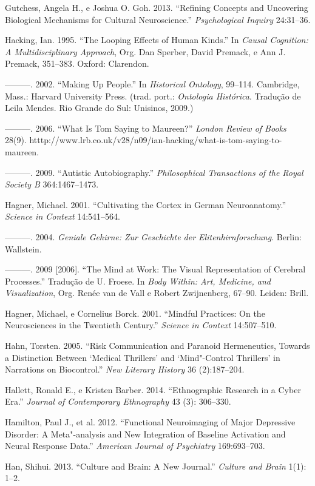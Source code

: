 Gutchess, Angela H., e Joshua O. Goh. 2013. ``Refining Concepts and
Uncovering Biological Mechanisms for Cultural Neuroscience.''
\emph{Psychological Inquiry} 24:31--36.

Hacking, Ian. 1995. ``The Looping Effects of Human Kinds.'' In
\emph{Causal Cognition: A Multidisciplinary Approach}, Org. Dan Sperber,
David Premack, e Ann J. Premack, 351--383. Oxford: Clarendon.

---------. 2002. ``Making Up People.'' In \emph{Historical Ontology},
99--114. Cambridge, Mass.: Harvard University Press. (trad. port.:
\emph{Ontologia Histórica}. Tradução de Leila Mendes. Rio Grande do Sul:
Unisinos, 2009.)

---------. 2006. ``What Is Tom Saying to Maureen?'' \emph{London Review
of Books} 28(9).
htttp://www.lrb.co.uk/v28/n09/ian-hacking/what-is-tom-saying-to-maureen.

---------. 2009. ``Autistic Autobiography.'' \emph{Philosophical
Transactions of the Royal Society B} 364:1467--1473.

Hagner, Michael. 2001. ``Cultivating the Cortex in German
Neuroanatomy.'' \emph{Science in Context} 14:541--564.

---------. 2004. \emph{Geniale Gehirne: Zur Geschichte der
Elitenhirnforschung}. Berlin: Wallstein.

---------. 2009 {[}2006{]}. ``The Mind at Work: The Visual
Representation of Cerebral Processes.'' Tradução de U. Froese. In
\emph{Body Within: Art, Medicine, and Visualization}, Org. Renée van de
Vall e Robert Zwijnenberg, 67--90. Leiden: Brill.

Hagner, Michael, e Cornelius Borck. 2001. ``Mindful Practices: On the
Neurosciences in the Twentieth Century.'' \emph{Science in Context}
14:507--510.

Hahn, Torsten. 2005. ``Risk Communication and Paranoid Hermeneutics,
Towards a Distinction Between `Medical Thrillers' and `Mind"-Control
Thrillers' in Narrations on Biocontrol.'' \emph{New Literary History} 36
(2):187--204.

Hallett, Ronald E., e Kristen Barber. 2014. ``Ethnographic Research in a
Cyber Era.'' \emph{Journal of Contemporary Ethnography} 43 (3):
306--330.

Hamilton, Paul J., et al. 2012. ``Functional Neuroimaging of Major
Depressive Disorder: A Meta"-analysis and New Integration of Baseline
Activation and Neural Response Data.'' \emph{American Journal of
Psychiatry} 169:693--703.

Han, Shihui. 2013. ``Culture and Brain: A New Journal.'' \emph{Culture
and Brain} 1(1): 1--2.

